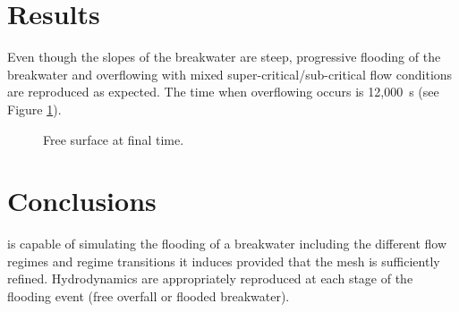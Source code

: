 \section{Results}
Even though the slopes of the breakwater are steep,
progressive flooding of the breakwater and overflowing
with mixed super-critical/sub-critical flow conditions are reproduced as expected.
The time when overflowing occurs is 12,000~s (see Figure \ref{fig:digue:FreeSurface}).

\begin{figure}[H]
 \centering
  \caption{Free surface at final time.}\label{fig:digue:FreeSurface}
\end{figure}

\section{Conclusions}

 is capable of simulating the flooding of a breakwater
including the different flow regimes and regime transitions
it induces provided that the mesh is sufficiently refined.
Hydrodynamics are appropriately reproduced at each stage
of the flooding event (free overfall or flooded breakwater).

